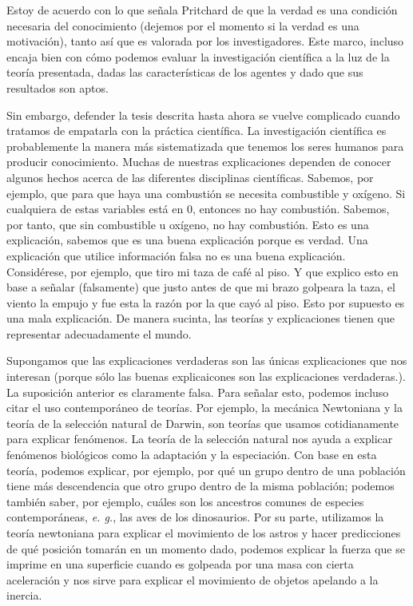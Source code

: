 \documentclass{article}
\begin{document}
Estoy de acuerdo con lo que señala Pritchard de que la verdad es una condición necesaria del conocimiento (dejemos por el momento si la verdad es una motivación), tanto así que es valorada por los investigadores. Este marco, incluso encaja bien con cómo podemos evaluar la investigación científica a la luz de la teoría presentada, dadas las características de los agentes y dado que sus resultados son aptos. 

Sin embargo, defender la tesis descrita hasta ahora se vuelve complicado cuando tratamos de empatarla con la práctica científica. La investigación científica es probablemente la manera más sistematizada que tenemos los seres humanos para producir conocimiento. Muchas de nuestras explicaciones dependen de conocer algunos hechos acerca de las diferentes disciplinas científicas. Sabemos, por ejemplo, que para que haya una combustión se necesita combustible y oxígeno. Si cualquiera de estas variables está en 0, entonces no hay combustión. Sabemos, por tanto, que sin combustible u oxígeno, no hay combustión. Esto es una explicación, sabemos que es una buena explicación porque es verdad. Una explicación que utilice información falsa no es una buena explicación. Considérese, por ejemplo, que tiro mi taza de café al piso. Y que explico esto en base a señalar (falsamente) que justo antes de que mi brazo golpeara la taza, el viento la empujo y fue esta la razón por la que cayó al piso. Esto por supuesto es una mala explicación. De manera sucinta, las teorías y explicaciones tienen que representar adecuadamente el mundo.

Supongamos que las explicaciones verdaderas son las únicas explicaciones que nos interesan (porque sólo las buenas explicaicones son las explicaciones verdaderas.). La suposición anterior es claramente falsa. Para señalar esto, podemos incluso citar el uso contemporáneo de teorías. Por ejemplo, la mecánica Newtoniana y la teoría de la selección natural de Darwin, son teorías que usamos cotidianamente para explicar fenómenos. La teoría de la selección natural nos ayuda a explicar fenómenos biológicos como la adaptación y la especiación. Con base en esta teoría, podemos explicar, por ejemplo, por qué un grupo dentro de una población tiene más descendencia que otro grupo dentro de la misma población; podemos también saber, por ejemplo, cuáles son los ancestros comunes de especies contemporáneas, \textit{e. g.}, las aves de los dinosaurios. Por su parte, utilizamos la teoría newtoniana para explicar el movimiento de los astros y hacer predicciones de qué posición tomarán en un momento dado, podemos explicar la fuerza que se imprime en una superficie cuando es golpeada por una masa con cierta aceleración y nos sirve para explicar el movimiento de objetos apelando a la inercia.
\end{document}

